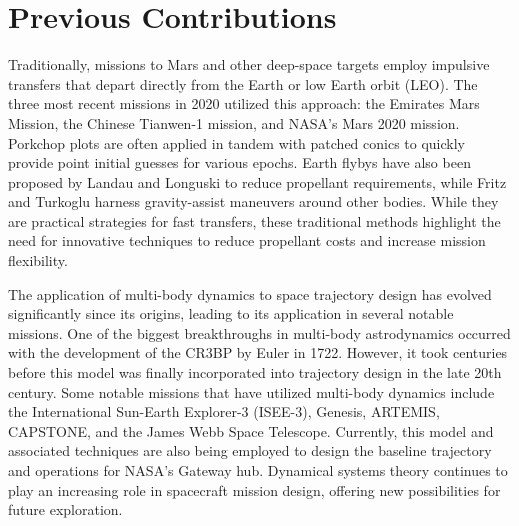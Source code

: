 \section{Previous Contributions}\label{sec:PreviousContributions}
Traditionally, missions to Mars and other deep-space targets employ impulsive transfers that depart
directly from the Earth or low Earth orbit (LEO). The three most recent missions in 2020 utilized
this approach: the Emirates Mars Mission\cite{Amiri:2022}, the Chinese Tianwen-1
mission\cite{Yang:2022}, and NASA's Mars 2020 mission\cite{Farley:2020}. Porkchop plots are often
applied in tandem with patched conics to quickly provide point initial guesses for various
epochs\cite{Drake:2009}. Earth flybys have also been proposed by Landau and Longuski to reduce
propellant requirements\cite{Landau:2006}, while Fritz and Turkoglu harness gravity-assist
maneuvers around other bodies\cite{Fritz:2016}. While they are practical strategies for fast
transfers, these traditional methods highlight the need for innovative techniques to reduce
propellant costs and increase mission flexibility.

The application of multi-body dynamics to space trajectory design has evolved significantly since
its origins, leading to its application in several notable missions. One of the biggest
breakthroughs in multi-body astrodynamics occurred with the development of the CR3BP by Euler in
1722\cite{BarrowGreen:1997}. However, it took centuries before this model was finally incorporated
into trajectory design in the late 20th century. Some notable missions that have utilized
multi-body dynamics include the International Sun-Earth Explorer-3 (ISEE-3)\cite{Farquhar:1984},
Genesis\cite{Lo:2001}, ARTEMIS\cite{Woodard:2009}, CAPSTONE\cite{Cheetham:2021}, and the James Webb
Space Telescope\cite{Menzel:2023}. Currently, this model and associated techniques are also being
employed to design the baseline trajectory and operations for NASA's Gateway
hub\cite{Zamora:2024,Boudad:2022,ZimovanSpreen:2022}. Dynamical systems theory continues to play an
increasing role in spacecraft mission design, offering new possibilities for future exploration.

